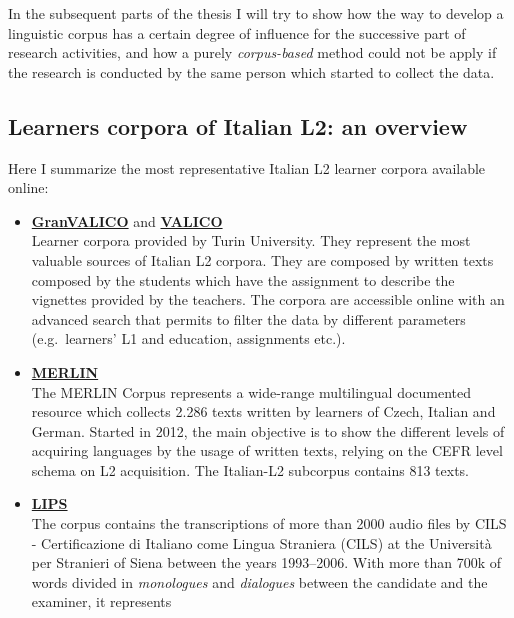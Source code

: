 \documentclass[a4paper,twoside,12pt,chapterprefix=false,bibliography=totocnumbered,listof=flat]{scrbook}
\theoremstyle{definition}
\theoremstyle{definition}
\theoremstyle{definition}
\theoremstyle{remark}
\begin{document}
In the subsequent parts of the thesis I will try to show how the way to
develop a linguistic corpus has a certain degree of influence for the
successive part of research activities, and how a purely
\emph{corpus-based} method could not be apply if the research is
conducted by the same person which started to collect the data.

\subsection{Learners corpora of Italian L2: an
overview}\label{learners-corpora-of-italian-l2-an-overview}

Here I summarize the most representative Italian L2 learner corpora
available online:

\begin{itemize}
\item
  \textbf{\href{http://www.valico.org/valico_b_CORPUS.html}{GranVALICO}}
  and \textbf{\href{http://www.valico.org/valico_CORPUS.html}{VALICO}}
  \citep{valico}\\
  Learner corpora provided by Turin University. They represent the most
  valuable sources of Italian L2 corpora. They are composed by written
  texts composed by the students which have the assignment to describe
  the vignettes provided by the teachers. The corpora are accessible
  online with an advanced search that permits to filter the data by
  different parameters (e.g.~learners' L1 and education, assignments
  etc.).
\item
  \textbf{\href{http://merlin-platform.eu}{MERLIN}} \citep{merlin}\\
  The MERLIN Corpus represents a wide-range multilingual documented
  resource which collects 2.286 texts written by learners of Czech,
  Italian and German. Started in 2012, the main objective is to show the
  different levels of acquiring languages by the usage of written texts,
  relying on the CEFR level schema on L2 acquisition. The Italian-L2
  subcorpus contains 813 texts.
\item
  \textbf{\href{http://parlaritaliano.it/index.php/en/data/653-corpus-lips}{LIPS}}
  \citep{lips}\\
  The corpus contains the transcriptions of more than 2000 audio files
  by CILS - Certificazione di Italiano come Lingua Straniera (CILS) at
  the Università per Stranieri of Siena between the years 1993--2006.
  With more than 700k of words divided in \emph{monologues} and
  \emph{dialogues} between the candidate and the examiner, it represents

\end{itemize}
\end{document}
